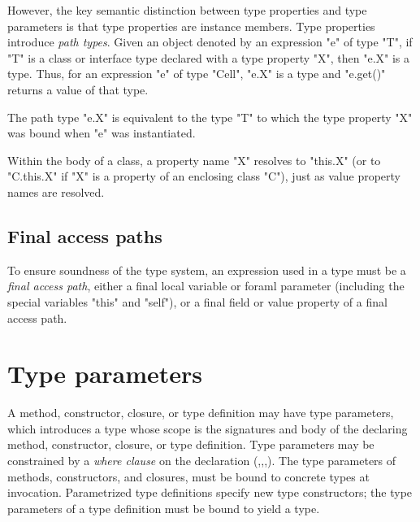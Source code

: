 \label{PathTypes}

However, the key semantic distinction between type properties
and type parameters is that type properties are instance
members.
%
        Type properties introduce {\em path types}.
        Given an object
        denoted by an expression \xcd"e" of type \xcd"T",
        if \xcd"T" is a class or interface type declared with
        a type property \xcd"X", then \xcd"e.X" is a type.
Thus, for an expression \xcd"e" of type \xcd"Cell", \xcd"e.X" is a type
and \xcd"e.get()" returns a value of that type.

The path type \xcd"e.X" is equivalent to the type \xcd"T" to which
the type property \xcd"X" was bound when \xcd"e" was
instantiated.

Within the body of a class, a property name \xcd"X" resolves
to \xcd"this.X" (or to \xcd"C.this.X" if \xcd"X" is a property of
an enclosing class \xcd"C"), just as value property names are
resolved.

\subsection{Final access paths}
\label{FinalAccessPath}

        To ensure soundness of the type system, an expression
        used in a type
        must be a \emph{final access path}, either a final
        local variable or foraml parameter (including the special variables
        \xcd"this" and \xcd"self"), or a final field or value
        property of a final access path.

\section{Type parameters}
\label{TypeParameters}


        A method, constructor, closure, or type definition
        may have type parameters, which
        introduces a type whose scope is the signatures and body
        of the declaring method, constructor, closure, or type
        definition.
        Type parameters may be constrained by a {\em where
        clause} on the declaration
        (,,,).
        The type parameters of methods, constructors, and
        closures, must be bound to
        concrete types at invocation.
        Parametrized type definitions specify new type
        constructors; the type parameters of a type definition must be bound
        to yield a type.

